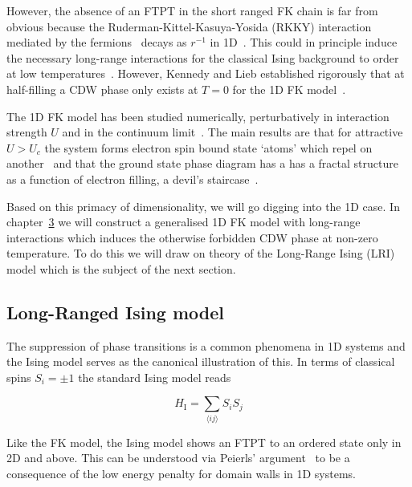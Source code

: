 However, the absence of an FTPT in the short ranged FK chain is far from obvious because the Ruderman-Kittel-Kasuya-Yosida (RKKY) interaction mediated by the fermions~\autocite{kasuyaTheoryMetallicFerro1956,rudermanIndirectExchangeCoupling1954,vanvleckNoteInteractionsSpins1962,yosidaMagneticPropertiesCuMn1957} decays as \(r^{-1}\) in 1D~\autocite{rusinCalculationRKKYRange2017}. This could in principle induce the necessary long-range interactions for the classical Ising background to order at low temperatures~\autocite{thoulessLongRangeOrderOneDimensional1969,peierlsIsingModelFerromagnetism1936}. However, Kennedy and Lieb established rigorously that at half-filling a CDW phase only exists at \(T = 0\) for the 1D FK model~\autocite{kennedyItinerantElectronModel1986}.

The 1D FK model has been studied numerically, perturbatively in interaction strength \(U\) and in the continuum limit~\autocite{bursillOneDimensionalContinuum1994}. The main results are that for attractive \(U > U_c\) the system forms electron spin bound state `atoms' which repel on another~\autocite{gruberGroundStateEnergyLowTemperature1993} and that the ground state phase diagram has a has a fractal structure as a function of electron filling, a devil's staircase~\autocite{freericksTwostateOnedimensionalSpinless1990,michelettiCompleteDevilStaircase1997}.

Based on this primacy of dimensionality, we will go digging into the 1D case. In chapter~\protect\hyperlink{chap:3-the-long-range-falicov-kimball-model}{3} we will construct a generalised 1D FK model with long-range interactions which induces the otherwise forbidden CDW phase at non-zero temperature. To do this we will draw on theory of the Long-Range Ising (LRI) model which is the subject of the next section.

\hypertarget{long-ranged-ising-model}{%
\subsection{Long-Ranged Ising model}\label{long-ranged-ising-model}}

The suppression of phase transitions is a common phenomena in 1D systems and the Ising model serves as the canonical illustration of this. In terms of classical spins \(S_i = \pm 1\) the standard Ising model reads

\[H_{\mathrm{I}} = \sum_{\langle ij \rangle} S_i S_j\]

Like the FK model, the Ising model shows an FTPT to an ordered state only in 2D and above. This can be understood via Peierls' argument~\autocite{peierlsIsingModelFerromagnetism1936,kennedyItinerantElectronModel1986} to be a consequence of the low energy penalty for domain walls in 1D systems.


